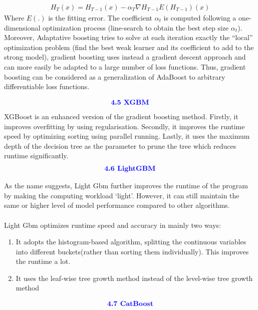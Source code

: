 \documentclass{homework}
\begin{document}
 \begin{align*}
    H_T(x) = H_{T-1}(x) - \alpha_T \nabla{H_{T-1}} E(H_{T-1})(x)
 \end{align*}
 Where $E(.)$ is the fitting error. 
 The coefficient $\alpha_t$ is computed following a one-dimensional optimization process (line-search to obtain the best step size $\alpha_t$). Moreover, Adaptative boosting tries to solve at each iteration exactly the “local” optimization problem (find the best weak learner and its coefficient to add to the strong model), gradient boosting uses instead a gradient descent approach and can more easily be adapted to a large number of loss functions. Thus, gradient boosting can be considered as a generalization of AdaBoost to arbitrary differentiable loss functions.

 \begin{align*}
    \textcolor{blue}{ \text{{\textbf{4.5 XGBM}}}}
 \end{align*}
 XGBoost is an enhanced version of the gradient boosting method. Firstly, it improves overfitting by using regularisation. Secondly, it improves the runtime speed by optimizing sorting using parallel running. Lastly, it uses the maximum depth of the decision tree as the parameter to prune the tree which reduces runtime significantly.
 \begin{align*}
    \textcolor{blue}{ \text{{\textbf{4.6 LightGBM}}}}
 \end{align*}

 As the name suggests, Light Gbm further improves the runtime of the program by making the computing workload ‘light’. However, it can still maintain the same or higher level of model performance compared to other algorithms. \\
\\
Light Gbm optimizes runtime speed and accuracy in mainly two ways:
\begin{enumerate}
    \item It adopts the histogram-based algorithm, splitting the continuous variables into different buckets(rather than sorting them individually). This improves the runtime a lot.
    \item It uses the leaf-wise tree growth method instead of the level-wise tree growth method
\end{enumerate}

\begin{align*}
    \textcolor{blue}{ \text{{\textbf{4.7 CatBoost}}}}
 \end{align*}
\end{document}
